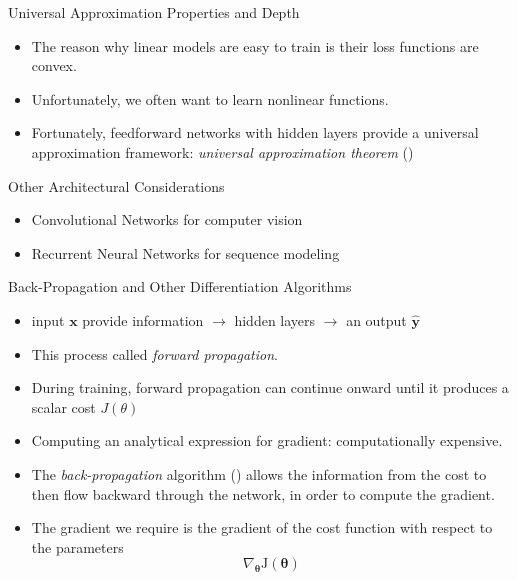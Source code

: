 \documentclass[10pt]{beamer}
\begin{document}
	\begin{frame}{Universal Approximation Properties and Depth}
		\begin{itemize}
			\item The reason why linear models are easy to train is their loss functions are convex.
			\item Unfortunately, we often want to learn nonlinear functions.
			\item Fortunately, feedforward networks with hidden layers provide a universal approximation framework: \emph{universal approximation theorem} (\citet{hornik1989multilayer,cybenko1989approximation})
		\end{itemize}
	\end{frame}

	\begin{frame}{Other Architectural Considerations}
		\begin{itemize}
			\item Convolutional Networks for computer vision
			\item Recurrent Neural Networks for sequence modeling
		\end{itemize}
	\end{frame}

	\begin{frame}{Back-Propagation and Other Differentiation Algorithms}
		\begin{itemize}
			\item input $\bm{x}$ provide information $\rightarrow$ hidden layers $\rightarrow$ an output $\hat{\bm{y}}$
			\item This process called \emph{forward propagation}.
			\item During training, forward propagation can continue onward until it produces a scalar cost $J(\theta)$
			\item Computing an analytical expression for gradient: computationally expensive.
			\item The \emph{back-propagation} algorithm (\citet{williams1986learning}) allows the information from the cost to then flow backward through the network, in order to compute the gradient.
			\item The gradient we require is the gradient of the cost function with respect to the parameters
			$$\nabla_{\bm{\theta}} \mathrm{J}(\bm{\theta})$$
		\end{itemize}
	\end{frame}
\end{document}
